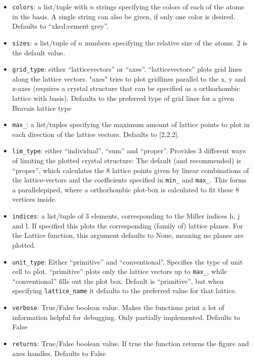\documentclass[a4paper,11pt]{article}
\numberwithin{equation}{section}
\begin{document}
	\begin{itemize}
		\item \texttt{colors}: a list/tuple with $ n $ strings specifying the colors of each of the atoms in the basis. A single string can also be given, if only one color is desired. Defaults to ``xkcd:cement grey''.
		\item \texttt{sizes}: a list/tuple of $ n $ numbers specifying the relative size of the atoms. 2 is the default value.
		\item \texttt{grid\_type}: either ``latticevectors'' or ``axes''. ``latticevectors'' plots grid lines along the lattice vectors. "axes" tries to plot gridlines parallel to the x, y and z-axes (requires a crystal structure that can be specified as a orthorhombic lattice with basis). Defaults to the preferred type of grid lines for a given Bravais lattice type
		\item \texttt{max\_}: a list/tuples specifying the maximum amount of lattice points to plot in each direction of the lattice vectors. Defaults to [2,2,2].
		\item \texttt{lim\_type}: either ``individual'', ``sum'' and ``proper''. Provides 3 different ways of limiting the plotted crystal structure: The default (and recommended) is ``proper'', which calculates the 8 lattice points given by linear combinations of the lattice-vectors and the coefficients specified in \texttt{min\_} and \texttt{max\_}. This forms a parallelepiped, where a orthorhombic plot-box is calculated to fit these 8 vertices inside.
		\item \texttt{indices}: a list/tuple of 3 elements, corresponding to the Miller indices h, j and l. If specified this plots the corresponding (family of) lattice planes. For the Lattice function, this argument defaults to None, meaning no planes are plotted.
		\item \texttt{unit\_type}: Either ``primitive'' and ``conventional''. Specifies the type of unit cell to plot. ``primitive'' plots only the lattice vectors up to \texttt{max\_}, while ``conventional'' fills out the plot box. Default is ``primitive'', but when specifying \texttt{lattice\_name} it defaults to the preferred value for that lattice.
		\item \texttt{verbose}: True/False boolean value. Makes the functions print a lot of information helpful for debugging. Only partially implemented. Defaults to False
		\item \texttt{returns}: True/False boolean value. If true the function returns the figure and axes handles. Defaults to False
	\end{itemize}
\end{document}
